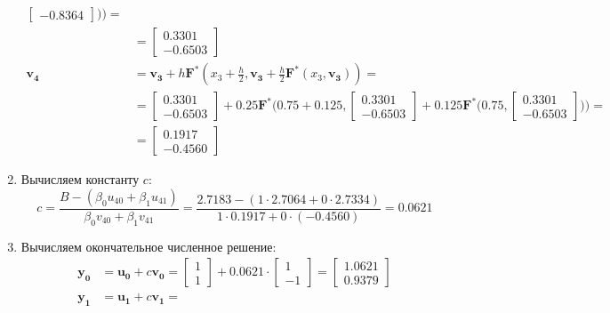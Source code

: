 \documentclass[a4paper, 12pt]{article}
\begin{document}
\begin{enumerate}
\begin{align*}
\begin{bmatrix}
					-0.8364
				\end{bmatrix}\bigg)\bigg)=\\&=
				\begin{bmatrix}
					0.3301\\
					-0.6503
				\end{bmatrix}\\
				\mathbf{v_4}&=\mathbf{v_3} + h\mathbf{F^*}(x_3 + \frac{h}{2}, \mathbf{v_3}+\frac{h}{2}\mathbf{F^*}(x_3,\mathbf{v_3}))=\\&=
				\begin{bmatrix}
					0.3301\\
					-0.6503
				\end{bmatrix} + 0.25\mathbf{F^*}\bigg(0.75 + 0.125, 
				\begin{bmatrix}
					0.3301\\
					-0.6503
				\end{bmatrix} + 0.125\mathbf{F^*}\bigg(0.75, 
				\begin{bmatrix}
					0.3301\\
					-0.6503
				\end{bmatrix}\bigg)\bigg)=\\&=
				\begin{bmatrix}
					0.1917\\
					-0.4560
				\end{bmatrix}
			\end{align*}
		\item Вычисляем константу $c$:
			\begin{equation*}
				c=\dfrac{B-(\beta_0u_{40}+\beta_1u_{41})}{\beta_0v_{40}+\beta_1v_{41}}=
				\dfrac{2.7183-(1\cdot2.7064+0\cdot2.7334)}{1\cdot0.1917+0\cdot(-0.4560)}=0.0621
			\end{equation*}
		\item Вычисляем окончательное численное решение:
			\begin{align*}
				\mathbf{y_0}&=\mathbf{u_0}+c\mathbf{v_0}=
				\begin{bmatrix}
					1\\
					1
				\end{bmatrix} + 0.0621 \cdot 
				\begin{bmatrix}
					1\\
					-1
				\end{bmatrix} = 
				\begin{bmatrix}
					1.0621\\
					0.9379
				\end{bmatrix}\\
				\mathbf{y_1}&=\mathbf{u_1}+c\mathbf{v_1}=

\end{align*}
\end{enumerate}
\end{document}
